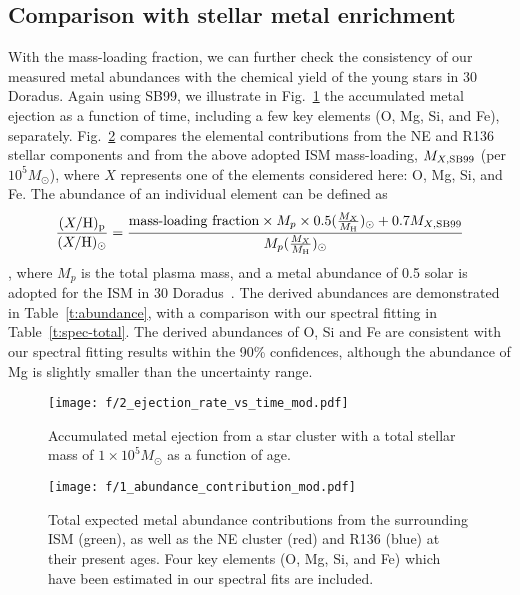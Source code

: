 \documentclass[usenatbib]{mnras}
\def\xs{30 Doradus}
\begin{document}
\subsection{Comparison with stellar metal enrichment}

With the mass-loading fraction, we can further check the consistency of our measured metal abundances with the chemical yield of the young stars in \xs. Again using SB99, we illustrate  in Fig.~\ref{f:elem} the accumulated metal ejection as a function of time, including a few key elements (O, Mg, Si, and Fe), separately. 
Fig.~\ref{f:abun} compares the elemental contributions from the NE and R136 stellar components and from the above adopted ISM mass-loading, $M_{X, {\rm SB99}}$ (per $10^5M_{\odot}$), where $X$ represents one of the elements considered here: O, Mg, Si, and Fe. The abundance of an individual element can be defined as 
\begin{displaymath}
\frac{(X/\rm{H})_p}{(X/\rm{H})_\odot} = \frac{\text{mass-loading fraction} \times M_{p}\times0.5(\frac{M_{X}}{M_{\rm H}})_\odot+0.7M_{X, {\rm SB99}}}{M_{p}(\frac{M_{X}}{M_{\rm H}})_\odot}
\end{displaymath} 
, where $M_p$ is the total plasma mass, and a metal abundance of 0.5 solar is adopted for the ISM in \xs\ \citep{Pellegrini11}. The derived abundances are demonstrated in Table~\ref{t:abundance}, with a comparison with our spectral fitting in Table~\ref{t:spec-total}. The derived abundances of O, Si and Fe are consistent with our spectral fitting results within the 90\% confidences, although the abundance of Mg is slightly smaller than the uncertainty range.

\begin{figure}
\texttt{[image: f/2\_ejection\_rate\_vs\_time\_mod.pdf]}
\caption{Accumulated metal ejection from a star cluster with a total stellar mass of $1\times10^5M_{\odot}$ as a function of age.
}
\label{f:elem}
\end{figure}


\begin{figure}
\texttt{[image: f/1\_abundance\_contribution\_mod.pdf]}
\caption{Total expected metal abundance contributions from the surrounding ISM (green), as well as the NE cluster (red) and R136 (blue) at their present ages. Four key elements (O, Mg, Si, and Fe) which have been estimated in our spectral fits are included.}
\label{f:abun}
\end{figure}
\end{document}
